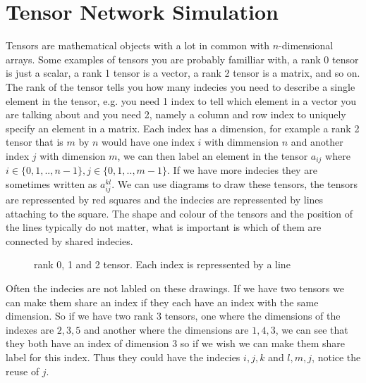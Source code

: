\section{Tensor Network Simulation}
Tensors are mathematical objects with a lot in common with $n$-dimensional arrays. Some examples of tensors you are probably familliar with, a rank 0 tensor is just a scalar, a rank 1 tensor is a vector, a rank 2 tensor is a matrix, and so on. The rank of the tensor tells you how many indecies you need to describe a single element in the tensor, e.g. you need 1 index to tell which element in a vector you are talking about and you need 2, namely a column and row index to uniquely specify an element in a matrix. 
Each index has a dimension, for example a rank 2 tensor that is $m$ by $n$ would have one index $i$ with dimmension $n$ and another index $j$ with dimension $m$, we can then label an element in the tensor $a_{ij}$ where $i\in \{0,1,..,n-1\}, j\in \{0,1,..,m-1\}$. If we have more indecies they are sometimes written as $a_{ij}^{kl}$.
We can use diagrams to draw these tensors, the tensors are repressented by red squares and the indecies are repressented by lines attaching to the square. The shape and colour of the tensors and the position of the lines typically do not matter, what is important is which of them are connected by shared indecies. 

\begin{figure}[H]
    \centering 
    \caption{rank 0, 1 and 2 tensor. Each index is repressented by a line}
    \label{fig:r2t}
\end{figure}

\noindent
Often the indecies are not labled on these drawings. If we have two tensors we can make them share an index if they each have an index with the same dimension. So if we have two rank 3 tensors, one where the dimensions of the indexes are $2, 3, 5$ and another where the dimensions are $1, 4, 3$, we can see that they both have an index of dimension 3 so if we wish we can make them share label for this index. Thus they could have the indecies $i, j, k$ and $l, m, j$, notice the reuse of $j$. 

